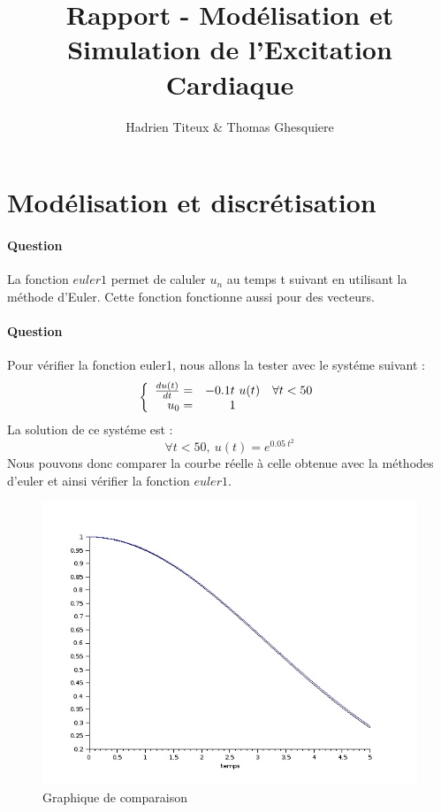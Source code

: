 \documentclass[11pt]{article}
\title{\textbf{Rapport - Modélisation et Simulation de l'Excitation Cardiaque}}
\author{Hadrien Titeux \& Thomas Ghesquiere}
\date{}
\newcounter{question_num}
\begin{document}
\maketitle

\section{Modélisation et discrétisation}
	\paragraph{Question  \\}
	La fonction $ euler1 $ permet de caluler $ u_{n} $ au temps t suivant en utilisant la méthode d'Euler. Cette fonction fonctionne aussi pour des vecteurs.
	
	\paragraph{Question  \\}
	Pour vérifier la fonction euler1, nous allons la tester avec le systéme suivant :
	\[
	\left\{
	\begin {array}{r c l}
	\frac{du(t)}{dt} =& -0.1 t \ u(t) & \forall t < 50 \\
	u_{0}=& 1
	\end {array}
	\right.
	\]
	La solution de ce systéme est :
	\[
	\forall t < 50, \ u(t)=e^{0.05 \ t^2}
	\]
	Nous pouvons donc comparer la courbe réelle à celle obtenue avec la méthodes d'euler et ainsi vérifier la fonction $euler1$.
	\begin{figure}[H]
	\begin{center}
		\includegraphics[width=8 cm]{question2.jpeg}
		\caption{ Graphique de comparaison}
	\end{center}
	\end{figure}
	
\end{document}
